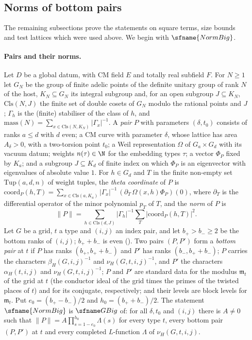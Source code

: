 \subsection{Norms of bottom pairs}\label{sec:pf:fit:normbig}

The remaining subsections prove the statements on square terms, size bounds and test lattices which were used above.
We begin with $\sfname{NormBig}$.

\paragraph{Pairs and their norms.}
Let $D$ be a global datum, with CM field $E$ and totally real subfield $F$. For $N\ge1$ let $G_N$ be the group of finite
adelic points of the definite unitary group of rank $N$ of the host, $K_N\subseteq G_N$ its integral subgroup and, for an
open subgroup $J\subseteq K_N$, $\mathrm{Cls}(N,J)$ the finite set of double cosets of $G_N$ modulo the rational points and
$J$; $\Gamma_h$ is the (finite) stabiliser of the class of $h$, and
$\mathrm{mass}(N)=\sum_{x\in\mathrm{Cls}(N,K_N)}|\Gamma_x|^{-1}$. A \emph{pair} $P$ with parameters $(\delta,t_0)$ consists
of ranks $a\le d$ with $d$ even; a CM curve with parameter $\delta$, whose lattice has area $A_\delta>0$, with a two-torsion
point $t_0$; a Weil representation $\Omega$ of $G_a\times G_d$ with its vacuum datum; weights $n(\tau)\in\N$ for the embedding
types $\tau$; a vector $\Phi_P$ fixed by $K_a$; and a subgroup $J\subseteq K_d$ of finite index on which $\Phi_P$ is an
eigenvector with eigenvalues of absolute value $1$. For $h\in G_d$ and $T$ in the finite non-empty set $\mathrm{Tup}(a,d,n)$
of weight tuples, the \emph{theta coordinate} of $P$ is
$\mathrm{coord}_P(h,T)=\sum_{x\in\mathrm{Cls}(a,K_a)}|\Gamma_x|^{-1}\,(\partial_T\,\Omega(x,h)\Phi_P)(0)$, where $\partial_T$
is the differential operator of the minor polynomial $p_T$ of $T$, and the \emph{norm} of $P$ is
\begin{equation}\label{eq:pf:fit:pairnorm}
\|P\|=\sum_{h\in\mathrm{Cls}(d,J)}|\Gamma_h|^{-1}\sum_{T}|\mathrm{coord}_P(h,T)|^2 .
\end{equation}
Let $G$ be a grid, $t$ a type and $(i,j)$ an index pair, and let $b_+>b_-\ge2$ be the bottom ranks of $(i,j)$; $b_++b_-$ is
even (). Two pairs $(P,P')$ form a \emph{bottom pair} at $t$ if $P$ has
ranks $(b_+,b_++b_-)$ and $P'$ has ranks $(b_-,b_++b_-)$; $P$ carries the characters $\beta_H(G,i,j)^{-1}$ and
$\nu_H(G,t,i,j)^{-1}$, and $P'$ the characters $\alpha_H(t,i,j)$ and $\nu_H(G,t,i,j)^{-1}$; $P$ and $P'$ are standard data for
the modulus $\mathfrak m_t$ of the grid at $t$ (the conductor ideal of the grid times the primes of the twisted places of
$t$) and for its conjugate, respectively; and their levels are block levels for $\mathfrak m_t$. Put $e_0=(b_+-b_-)/2$ and
$h_0=(b_++b_-)/2$. The statement $\sfname{NormBig}$ is $\fitGBig$ of: for all $\delta,t_0$ and $(i,j)$ there is $A\ne0$ such
that $\|P\|=A\prod_{s=1-e_0}^{h_0}\Lambda(s)$ for every type $t$, every bottom pair $(P,P')$ at $t$ and every completed
$L$-function $\Lambda$ of $\nu_H(G,t,i,j)$.


